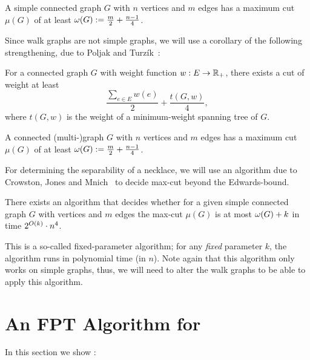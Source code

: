 \documentclass[a4paper,UKenglish,cleveref, thm-restate]{lipics-v2021}
\begin{document}
\begin{theorem}
    A simple connected graph $G$ with $n$ vertices and $m$ edges has a maximum cut $\mu(G)$ of at least $\omega(G):=\frac{m}{2}+\frac{n-1}{4}$.
\end{theorem}

Since walk graphs are not simple graphs, we will use a corollary of the following strengthening, due to Poljak and Turzík~\cite{poljakBoundForNonsimple}:
\begin{theorem}
    For a connected graph $G$ with weight function $w:E\rightarrow\mathbb{R}_+$, there exists a cut of weight at least
    \[\frac{\sum_{e\in E}w(e)}{2}+\frac{t(G,w)}{4},\]
    where $t(G,w)$ is the weight of a minimum-weight spanning tree of $G$.
\end{theorem}
\begin{corollary}\label{cor:multigraphErdos}
A connected (multi-)graph $G$ with $n$ vertices and $m$ edges has a maximum cut $\mu(G)$ of at least $\omega(G):=\frac{m}{2}+\frac{n-1}{4}$.
\end{corollary}

For determining the separability of a necklace, we will use an algorithm due to Crowston, Jones and Mnich~\cite{blackboxFPT} to decide max-cut beyond the Edwards-\erdos bound.

\begin{theorem}
\label{thm:blackbox}
There exists an algorithm that decides whether for a given simple connected graph $G$ with \dimension vertices and $m$ edges the max-cut $\mu(G)$ is at most
$\bound(G)+ \const$
in time $2^{O(\const)}\cdot \dimension^4$.
\end{theorem}

This is a so-called fixed-parameter algorithm; for any \emph{fixed} parameter $k$, the algorithm runs in polynomial time (in $n$). Note again that this algorithm only works on simple graphs, thus, we will need to alter the walk graphs to be able to apply this algorithm.



\section{An FPT Algorithm for \TwoThiefNecklaceSplitting}

In this section we show :

\polytimeNecklaceSplitting*
\end{document}
